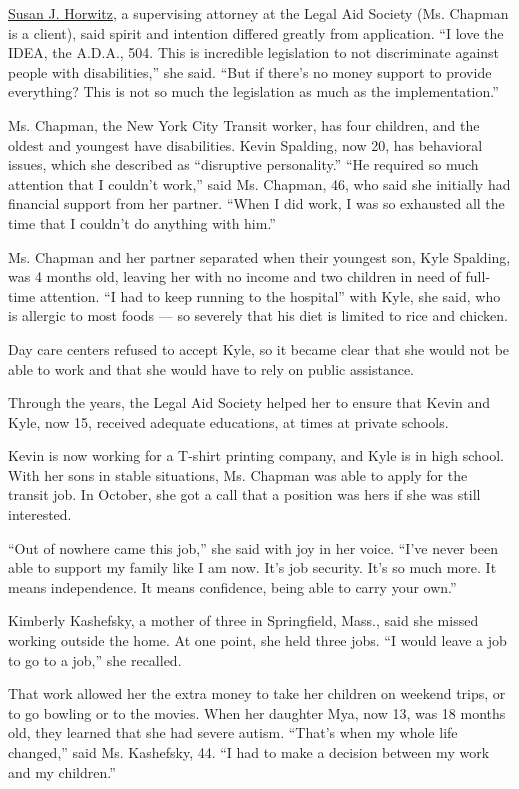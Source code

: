 \href{https://www.pli.edu/faculty/susan-j.-horwitz-23354}{Susan J.
Horwitz}, a supervising attorney at the Legal Aid Society (Ms. Chapman
is a client), said spirit and intention differed greatly from
application. ``I love the IDEA, the A.D.A., 504. This is incredible
legislation to not discriminate against people with disabilities,'' she
said. ``But if there's no money support to provide everything? This is
not so much the legislation as much as the implementation.''

Ms. Chapman, the New York City Transit worker, has four children, and
the oldest and youngest have disabilities. Kevin Spalding, now 20, has
behavioral issues, which she described as ``disruptive personality.''
``He required so much attention that I couldn't work,'' said Ms.
Chapman, 46, who said she initially had financial support from her
partner. ``When I did work, I was so exhausted all the time that I
couldn't do anything with him.''

Ms. Chapman and her partner separated when their youngest son, Kyle
Spalding, was 4 months old, leaving her with no income and two children
in need of full-time attention. ``I had to keep running to the
hospital'' with Kyle, she said, who is allergic to most foods --- so
severely that his diet is limited to rice and chicken.

Day care centers refused to accept Kyle, so it became clear that she
would not be able to work and that she would have to rely on public
assistance.

Through the years, the Legal Aid Society helped her to ensure that Kevin
and Kyle, now 15, received adequate educations, at times at private
schools.

Kevin is now working for a T-shirt printing company, and Kyle is in high
school. With her sons in stable situations, Ms. Chapman was able to
apply for the transit job. In October, she got a call that a position
was hers if she was still interested.

``Out of nowhere came this job,'' she said with joy in her voice. ``I've
never been able to support my family like I am now. It's job security.
It's so much more. It means independence. It means confidence, being
able to carry your own.''

Kimberly Kashefsky, a mother of three in Springfield, Mass., said she
missed working outside the home. At one point, she held three jobs. ``I
would leave a job to go to a job,'' she recalled.

That work allowed her the extra money to take her children on weekend
trips, or to go bowling or to the movies. When her daughter Mya, now 13,
was 18 months old, they learned that she had severe autism. ``That's
when my whole life changed,'' said Ms. Kashefsky, 44. ``I had to make a
decision between my work and my children.''

